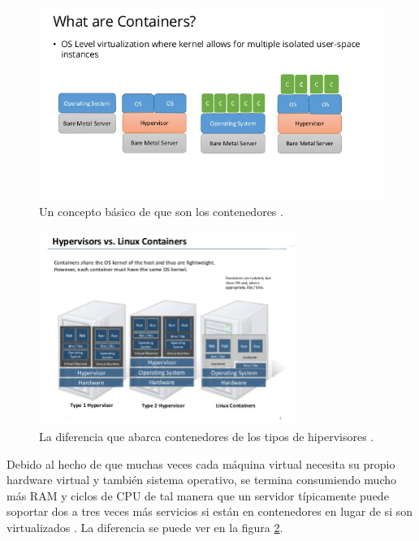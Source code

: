 \begin{figure}
  \begin{center}
      \includegraphics[width=\textwidth]{Figures/que-son-contenedores.jpg}
  \end{center}
  \caption{Un concepto básico de que son los contenedores \citep{Teimouri-Davoud-OS-level-virt}.}
  \label{que-son-contenedores}
\end{figure}

\begin{figure}
  \begin{center}
      \includegraphics[width=0.75\textwidth]{Figures/differencia-hipervisores-contenedores.png}
  \end{center}
  \caption{La diferencia que abarca contenedores de los tipos de hipervisores \citep{Teimouri-Davoud-OS-level-virt}.}
  \label{differencia-hipervisores-contenedores}
\end{figure}

Debido al hecho de que muchas veces cada máquina virtual necesita su propio hardware virtual y también sistema operativo, se termina consumiendo mucho más RAM y ciclos de CPU de tal manera que un servidor típicamente puede soportar dos a tres veces más servicios si están en contenedores en lugar de si son virtualizados \citep{Teimouri-Davoud-OS-level-virt}. La diferencia se puede ver en la figura \ref{differencia-hipervisores-contenedores}.

